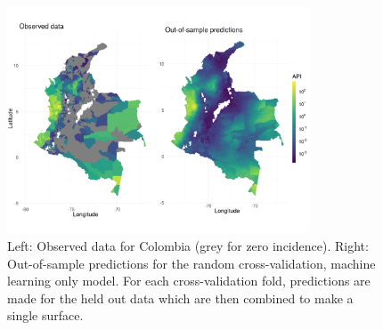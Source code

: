 \documentclass[11pt]{article}
\begin{document}
\begin{figure}
\centering
\includegraphics[trim={0 30mm 0 40mm}, width = 0.8\textwidth]{figs/col_obs_pred_map_ml.png} %
\caption{
  Left: Observed data for Colombia (grey for zero incidence). Right: Out-of-sample predictions for the random cross-validation, machine learning only model. For each cross-validation fold, predictions are made for the held out data which are then combined to make a single surface.
}
\label{f:map}
\end{figure}
\end{document}
